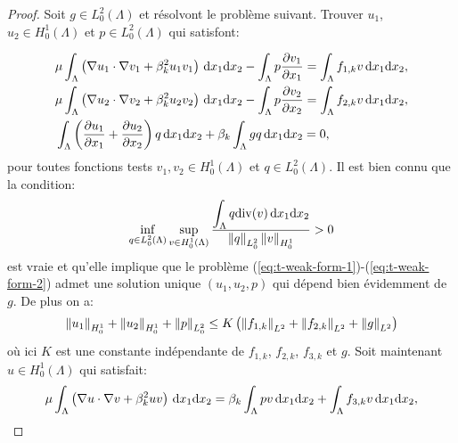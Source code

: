 \begin{proof}
  Soit $g\in L_0^2(\Lambda)$ et résolvont le problème
  suivant. Trouver $u_1$, $u_2\in H_0^1(\Lambda)$ et $p\in
  L_0^2(\Lambda)$ qui satisfont:

  \begin{align}
    &\mu\int_\Lambda \parent{\nabla u_1\cdot \nabla v_1 %
                            + \beta_k^2 u_1 v_1}\,\mathrm dx_1\mathrm dx_2 %
    - \int_\Lambda p\frac{\partial v_1}{\partial x_1} %
    = \int_\Lambda f_{1,k} v\, \mathrm dx_1\mathrm dx_2,\label{eq:t-weak-form-1}\\
    &\mu\int_\Lambda \parent{\nabla u_2\cdot \nabla v_2 %
                            + \beta_k^2 u_2 v_2}\,\mathrm dx_1\mathrm dx_2 %
    - \int_\Lambda p\frac{\partial v_2}{\partial x_2} %
    = \int_\Lambda f_{2,k} v\, \mathrm dx_1\mathrm dx_2,\label{eq:t-weak-form-2}\\
    &\int_\Lambda \parent{\frac{\partial u_1}{\partial x_1} %
                         + \frac{\partial u_2}{\partial x_2}} q \, \mathrm dx_1\mathrm dx_2 %
    + \beta_k \int_\Lambda g q\,\mathrm dx_1\mathrm dx_2 %
    = 0,\label{eq:t-weak-form-3}
  \end{align}
  pour toutes fonctions tests $v_1,v_2\in H_0^1(\Lambda)$ et $q\in
  L_0^2(\Lambda)$. Il est bien connu que la condition:
  \begin{equation}\label{eq:inf-sup}
    \inf_{q\in L_0^2(\Lambda)} %
    \sup_{v\in H_0^1(\Lambda)} %
    \frac{\displaystyle\int_\Lambda q\div(v)\,\mathrm dx_1\mathrm dx_2}%
         {\norm{q}_{L_0^2}\norm{v}_{H_0^1}}> 0
  \end{equation}
  est vraie et qu'elle implique que le problème
  (\ref{eq:t-weak-form-1})-(\ref{eq:t-weak-form-2}) admet une solution
  unique $(u_1, u_2, p)$ qui dépend bien évidemment de $g$. De
  plus on a:
  \begin{equation}\label{eq:t-estim-1}
    \norm{u_1}_{H_0^1} %
    + \norm{u_2}_{H_0^1} %
    + \norm{p}_{L_0^2} %
    \leq K\parent{\norm{f_{1,k}}_{L^2} %
    + \norm{f_{2,k}}_{L^2} %
    + \norm{g}_{L^2}}
  \end{equation}
  où ici $K$ est une constante indépendante de $f_{1,k}$, $f_{2,k}$,
  $f_{3,k}$ et $g$. Soit maintenant $u \in H_0^1(\Lambda)$ qui satisfait:
  \begin{equation}\label{eq:t-u-def}
    \electrolyteviscosity\int_\Lambda \parent{\nabla u\cdot \nabla v %
                         + \beta_k ^2 uv}\,\mathrm dx_1\mathrm dx_2 %
    = \beta_k\int_\Lambda pv\,\mathrm dx_1\mathrm dx_2 %
    + \int_\Lambda f_{3,k}v\,\mathrm dx_1\mathrm dx_2,%

\end{equation}
\end{proof}
